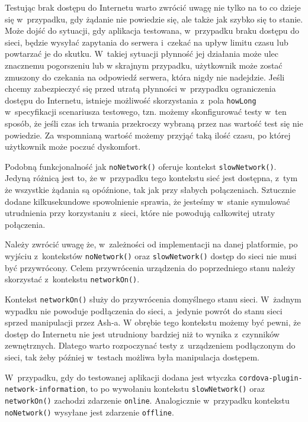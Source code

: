 \documentclass{xmgr}
\begin{document}
Testując brak dostępu do Internetu warto zwrócić uwagę nie tylko na to co dzieje się w~przypadku, gdy żądanie nie powiedzie się, ale także jak szybko się to stanie. Może dojść do sytuacji, gdy aplikacja testowana, w~przypadku braku dostępu do sieci, będzie wysyłać zapytania do serwera i~czekać na upływ limitu czasu lub powtarzać je do skutku. W~takiej sytuacji płynność jej działania może ulec znacznemu pogorszeniu lub w skrajnym przypadku, użytkownik może zostać zmuszony do czekania na odpowiedź serwera, która nigdy nie nadejdzie. Jeśli chcemy zabezpieczyć się przed utratą płynności w~przypadku ograniczenia dostępu do Internetu, istnieje możliwość skorzystania z~pola \texttt{howLong} w~specyfikacji scenariusza testowego, tzn. możemy skonfigurować testy w~ten sposób, że jeśli czas ich trwania przekroczy wybraną przez nas wartość test się nie powiedzie. Za wspomnianą wartość możemy przyjąć taką ilość czasu, po której użytkownik może poczuć dyskomfort. 

Podobną funkcjonalność jak \texttt{noNetwork()} oferuje kontekst \texttt{slowNetwork()}. Jedyną różnicą jest to, że w~przypadku tego kontekstu sieć jest dostępna, z~tym że wszystkie żądania są opóźnione, tak jak przy słabych połączeniach. Sztucznie dodane kilkusekundowe spowolnienie sprawia, że jesteśmy w~stanie symulować utrudnienia przy korzystaniu z~sieci, które nie powodują całkowitej utraty połączenia. 

Należy zwrócić uwagę że, w~zależności od implementacji na danej platformie, po wyjściu z~kontekstów \texttt{noNetwork()} oraz \texttt{slowNetwork()} dostęp do sieci nie musi być przywrócony. Celem przywrócenia urządzenia do poprzedniego stanu należy skorzystać z~kontekstu \texttt{networkOn()}. 

Kontekst \texttt{networkOn()} służy do przywrócenia domyślnego stanu sieci. W~żadnym wypadku nie powoduje podłączenia do sieci, a~jedynie powrót do stanu sieci sprzed manipulacji przez Ash-a. W obrębie tego kontekstu możemy być pewni, że dostęp do Internetu nie jest utrudniony bardziej niż to wynika z~czynników zewnętrznych. Dlatego warto rozpoczynać testy z~urządzeniem podłączonym do sieci, tak żeby później w~testach możliwa była manipulacja dostępem.

W~przypadku, gdy do testowanej aplikacji dodana jest wtyczka \texttt{cordova\--plugin-network-information},  to po wywołaniu kontekstu \texttt{slowNetwork()} oraz \texttt{networkOn()} zachodzi zdarzenie \texttt{online}. Analogicznie w~przypadku kontekstu \texttt{noNetwork()} wysyłane jest zdarzenie \texttt{offline}. 
\end{document}

